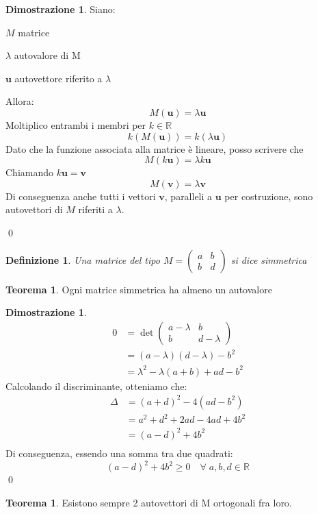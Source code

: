 \documentclass[10pt,a4paper]{article}
\theoremstyle{plain}
\newtheorem{definizione}[subsection]{Definizione}
\theoremstyle{definition}
\newtheorem{teorema}[subsection]{Teorema}
\newtheorem{dimostrazione}[subsection]{Dimostrazione}
\begin{document}
\begin{dimostrazione} Siano:
	
	$M$ matrice
	
	$\lambda$ autovalore di M
	
	$\mathbf{u}$ autovettore riferito a $\lambda$
	
	Allora:
	\[
	M(\mathbf{u})=\lambda\mathbf{u}
	\]
	Moltiplico entrambi i membri per $k\in\mathbb{R}$
	\[
	k(M(\mathbf{u}))=k(\lambda\mathbf{u})
	\]
	Dato che la funzione associata alla matrice è lineare, posso scrivere che
	\[
	M(k\mathbf{u})=\lambda k\mathbf{u}
	\]
	Chiamando $k\mathbf{u}=\mathbf{v}$
	\[
	M(\mathbf{v})=\lambda\mathbf{v}
	\]
	Di conseguenza anche tutti i vettori $\mathbf{v}$, paralleli a $\mathbf{u}$ per costruzione, sono autovettori di $M$ riferiti a $\lambda$.
	 
	\qed
\end{dimostrazione}
\begin{definizione}
	Una matrice del tipo $M=\begin{pmatrix}
		a & b \\ b & d
	\end{pmatrix}$ si dice simmetrica
\end{definizione}
\begin{teorema}
	Ogni matrice simmetrica ha almeno un autovalore \\
\end{teorema}
\begin{dimostrazione}
	\begin{align*}
		0&=\det{\begin{pmatrix}
			a-\lambda & b \\ b & d-\lambda
			\end{pmatrix}}
		\\
		&=(a-\lambda)(d-\lambda)-b^2\\
		&=\lambda^2 -\lambda(a+b) +ad -b^2
	\end{align*}
	Calcolando il discriminante, otteniamo che:
	\begin{align*}
		\Delta&=(a+d)^2-4(ad-b^2) \\
		&=a^2+d^2+2ad-4ad+4b^2\\
		&=(a-d)^2 + 4b^2\\
	\end{align*}
	Di conseguenza, essendo una somma tra due quadrati:
	\[
		(a-d)^2 + 4b^2 \ge 0 \quad \forall \; a,b,d\in\mathbb{R}
	\]
	\qed
\end{dimostrazione}
\newpage
\begin{teorema}
	Esistono sempre 2 autovettori di M ortogonali fra loro. 
\end{teorema}
\end{document}
